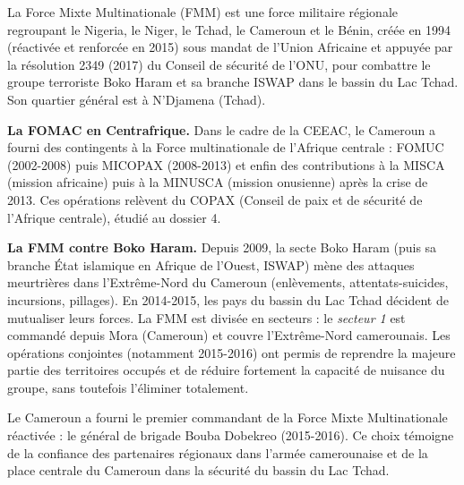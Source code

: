 \documentclass[11pt]{article}
\newcommand{\cle}[1]{{\popxbold\color{popdark}#1}}
\begin{document}
\begin{definition}
La \cle{Force Mixte Multinationale} (FMM) est une force militaire régionale regroupant le Nigeria, le Niger, le Tchad, le Cameroun et le Bénin, créée en 1994 (réactivée et renforcée en 2015) sous mandat de l'Union Africaine et appuyée par la résolution 2349 (2017) du Conseil de sécurité de l'ONU, pour combattre le groupe terroriste Boko Haram et sa branche ISWAP dans le bassin du Lac Tchad. Son quartier général est à N'Djamena (Tchad).
\end{definition}

\textbf{La FOMAC en Centrafrique.} Dans le cadre de la CEEAC, le Cameroun a fourni des contingents à la Force multinationale de l'Afrique centrale : FOMUC (2002-2008) puis MICOPAX (2008-2013) et enfin des contributions à la MISCA (mission africaine) puis à la MINUSCA (mission onusienne) après la crise de 2013. Ces opérations relèvent du COPAX (Conseil de paix et de sécurité de l'Afrique centrale), étudié au dossier 4.

\textbf{La FMM contre Boko Haram.} Depuis 2009, la secte Boko Haram (puis sa branche État islamique en Afrique de l'Ouest, ISWAP) mène des attaques meurtrières dans l'Extrême-Nord du Cameroun (enlèvements, attentats-suicides, incursions, pillages). En 2014-2015, les pays du bassin du Lac Tchad décident de mutualiser leurs forces. La FMM est divisée en secteurs : le \emph{secteur 1} est commandé depuis Mora (Cameroun) et couvre l'Extrême-Nord camerounais. Les opérations conjointes (notamment 2015-2016) ont permis de reprendre la majeure partie des territoires occupés et de réduire fortement la capacité de nuisance du groupe, sans toutefois l'éliminer totalement.

\begin{savaistu}
Le Cameroun a fourni le premier commandant de la Force Mixte Multinationale réactivée : le général de brigade Bouba Dobekreo (2015-2016). Ce choix témoigne de la confiance des partenaires régionaux dans l'armée camerounaise et de la place centrale du Cameroun dans la sécurité du bassin du Lac Tchad.
\end{savaistu}
\end{document}
